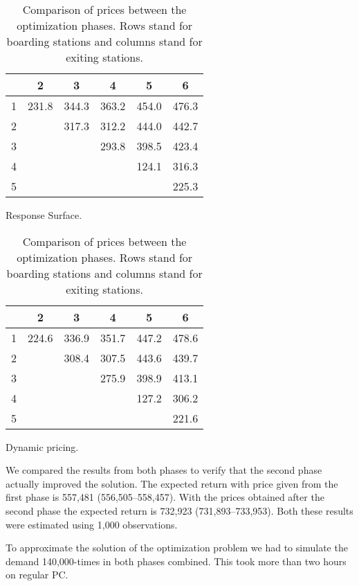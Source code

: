 \begin{table}[t]
	\begin{subtable}[b]{0.49\textwidth}
    \centering
			\begin{tabular}{cccccc}
				\hline
				 & 2 & 3 & 4 & 5 & 6 \\ 
				\hline
				1 & 231.8 & 344.3 & 363.2 & 454.0 & 476.3 \\ 
				2 &  & 317.3 & 312.2 & 444.0 & 442.7 \\ 
				3 &  &  & 293.8 & 398.5 & 423.4 \\ 
				4 &  &  &  & 124.1 & 316.3 \\ 
				5 &  &  &  &  & 225.3 \\ 
				 \hline
			\end{tabular}    
		\caption{Response Surface.}
  \end{subtable}
	\hfill
	\begin{subtable}[b]{0.49\textwidth}
    \centering
			\begin{tabular}{cccccc}
				\hline
				 & 2 & 3 & 4 & 5 & 6 \\ 
				\hline
				1 & 224.6 & 336.9 & 351.7 & 447.2 & 478.6 \\ 
				2 &  & 308.4 & 307.5 & 443.6 & 439.7 \\ 
				3 &  &  & 275.9 & 398.9 & 413.1 \\ 
				4 &  &  &  & 127.2 & 306.2 \\ 
				5 &  &  &  &  & 221.6 \\ 
				 \hline
			\end{tabular}    
		\caption{Dynamic pricing.}
  \end{subtable}

	\caption{Comparison of prices between the optimization phases. Rows stand for boarding stations and columns stand for exiting stations.}
	\label{tab:priceSolutions}
\end{table}

We compared the results from both phases to verify that the second phase actually improved the solution. The expected return with price given from the first phase is 557,481 (556,505--558,457). With the prices obtained after the second phase the expected return is 732,923 (731,893--733,953). Both these results were estimated using 1,000 observations.

To approximate the solution of the optimization problem we had to simulate the demand 140,000-times in both phases combined.
This took more than two hours on regular PC.




